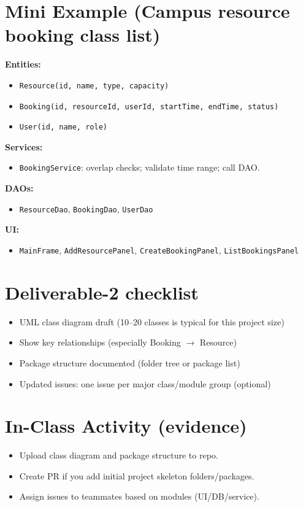 \documentclass[11pt]{article}
\begin{document}
\section{Mini Example (Campus resource booking class list)}
\textbf{Entities:}
\begin{itemize}
  \item \texttt{Resource(id, name, type, capacity)}
  \item \texttt{Booking(id, resourceId, userId, startTime, endTime, status)}
  \item \texttt{User(id, name, role)}
\end{itemize}

\textbf{Services:}
\begin{itemize}
  \item \texttt{BookingService}: overlap checks; validate time range; call DAO.
\end{itemize}

\textbf{DAOs:}
\begin{itemize}
  \item \texttt{ResourceDao}, \texttt{BookingDao}, \texttt{UserDao}
\end{itemize}

\textbf{UI:}
\begin{itemize}
  \item \texttt{MainFrame}, \texttt{AddResourcePanel}, \texttt{CreateBookingPanel}, \texttt{ListBookingsPanel}
\end{itemize}

\section{Deliverable-2 checklist}
\begin{itemize}
  \item UML class diagram draft (10--20 classes is typical for this project size)
  \item Show key relationships (especially Booking $\rightarrow$ Resource)
  \item Package structure documented (folder tree or package list)
  \item Updated issues: one issue per major class/module group (optional)
\end{itemize}

\section{In-Class Activity (evidence)}
\begin{itemize}
  \item Upload class diagram and package structure to repo.
  \item Create PR if you add initial project skeleton folders/packages.
  \item Assign issues to teammates based on modules (UI/DB/service).
\end{itemize}
\end{document}
